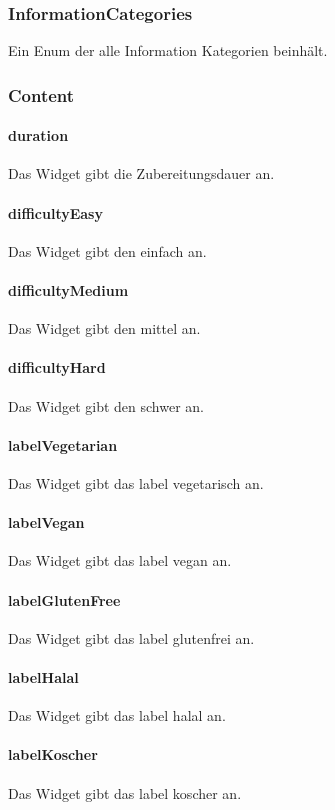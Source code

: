 \documentclass[parskip=full]{scrartcl}
\begin{document}
    \subsubsection{InformationCategories} \label{sec:InformationCategories}
        Ein Enum der alle Information Kategorien beinhält.
        \subsubsection*{Content}
            \paragraph*{duration} Das Widget gibt die Zubereitungsdauer an.
            \paragraph*{difficultyEasy} Das Widget gibt den  einfach an.
            \paragraph*{difficultyMedium} Das Widget gibt den  mittel an.
            \paragraph*{difficultyHard} Das Widget gibt den  schwer an.
            \paragraph*{labelVegetarian} Das Widget gibt das \gls{label} vegetarisch an.
            \paragraph*{labelVegan} Das Widget gibt das \gls{label} vegan an.
            \paragraph*{labelGlutenFree} Das Widget gibt das \gls{label} glutenfrei an.
            \paragraph*{labelHalal} Das Widget gibt das \gls{label} halal an.
            \paragraph*{labelKoscher} Das Widget gibt das \gls{label} koscher an.
\end{document}

